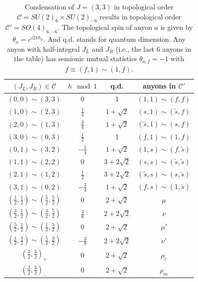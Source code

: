 \documentclass[aps, prl, superscriptaddress, twocolumn,
notitlepage, longbibliography,
floatfix]{revtex4-2}
\newcommand{\1}{\text{\uppercase\expandafter{\romannumeral1}}}
\newcommand{\2}{\text{\uppercase\expandafter{\romannumeral2}}}
\newcommand{\3}{\text{\uppercase\expandafter{\romannumeral3}}}
\newcommand{\4}{\text{\uppercase\expandafter{\romannumeral4}}}
\newcommand{\5}{\text{\uppercase\expandafter{\romannumeral5}}}
\newcommand{\6}{\text{\uppercase\expandafter{\romannumeral6}}}
\begin{document}
\vspace*{0pt}
\begin{table}[H]
\centering
\renewcommand{\arraystretch}{1.2}
\begin{tabular}{ |c | c | c | c |}
\hline
$(J_L,J_R)\in \mathcal{C}$ & $h\!\!\mod 1$ & q.d. & anyons in $\mathcal{C'}$ \\
\hline
$(0,0)\sim (3,3)$ & $0$ & 1 & $(1,1)\sim (f,f)$ \\
\hline
$(1,0)\sim (2,3)$ & $\frac{1}{4}$ & $1+\sqrt{2}$ & $(s,1)\sim (\tilde s,f)$ \\
\hline
$(2,0)\sim (1,3)$ & $\frac{3}{4}$ & $1+\sqrt{2}$ & $(\tilde s,1)\sim (s,f)$ \\
\hline
$(3,0)\sim (0,3)$ & $\frac{1}{2}$ & 1 & $(f,1)\sim (1,f)$ \\
\hline
$(0,1)\sim (3,2)$ & $-\frac{1}{4}$ & $1+\sqrt{2}$ & $(1,s)\sim (f,\tilde s)$ \\
\hline
$(1,1)\sim (2,2)$ & $0$ & $3+2\sqrt{2}$ & $(s,s)\sim (\tilde s,\tilde s)$ \\
\hline
$(2,1)\sim (1,2)$ & $\frac{1}{2}$ & $3+2\sqrt{2}$ & $(\tilde s,s)\sim (s,\tilde s)$ \\
\hline
$(3,1)\sim (0,2)$ & $-\frac{3}{4}$ & $1+\sqrt{2}$ & $(f,s)\sim (1,\tilde s)$ \\
\hline
$\left(\frac{1}{2},\frac{1}{2}\right)\sim \left(\frac{5}{2},\frac{5}{2}\right)$ & $0$ & $2+\sqrt{2}$ & $\mu$ \\
\hline
$\left(\frac{3}{2},\frac{1}{2}\right)\sim \left(\frac{3}{2},\frac{5}{2}\right)$ & $\frac{3}{8}$ & $2+2\sqrt{2}$ & $\nu$ \\
\hline
$\left(\frac{5}{2},\frac{1}{2}\right)\sim \left(\frac{1}{2},\frac{5}{2}\right)$ & $0$ & $2+\sqrt{2}$ & $\mu'$ \\
\hline
$\left(\frac{1}{2},\frac{3}{2}\right)\sim \left(\frac{5}{2},\frac{3}{2}\right)$ & $-\frac{3}{8}$ & $2+2\sqrt{2}$ & $\nu'$ \\
\hline
$\left(\frac{3}{2},\frac{3}{2}\right)_+$ & $0$ & $2+\sqrt{2}$ & $\rho_e$ \\
\hline
$\left(\frac{3}{2},\frac{3}{2}\right)_-$ & $0$ & $2+\sqrt{2}$ & $\rho_m$ \\
\hline
\end{tabular}
\caption{Condensation of $J=(3,3)$ in topological order $\mathcal{C}=SU(2)_6 \times SU(2)_{-6}$ results in topological order $\mathcal{C'}=SO(4)_{6,-6}$. The topological spin of anyon $a$ is given by $\theta_a = e^{i 2\pi h_a}$. And q.d. stands for quantum dimension. Any anyon with half-integral $J_L$ and $J_R$ (i.e., the last $6$ anyons in the table) has semionic mutual statistics $\theta_{a,f}=-1$ with $f\equiv (f,1)\sim (1,f)$.}
\label{tab:k=6}
\end{table}
\end{document}
